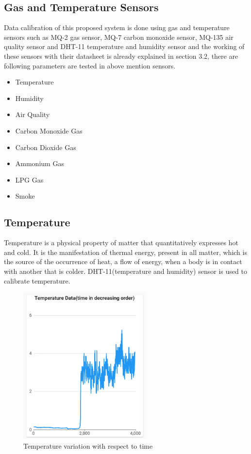 \subsection{Gas and Temperature Sensors}
Data calibration of this proposed system is done using gas and temperature sensors such as MQ-2 gas sensor, MQ-7 carbon monoxide sensor, MQ-135 air quality sensor and DHT-11 temperature and humidity sensor and the working of these sensors with their datasheet is already explained in section 3.2, there are following parameters are tested in above mention sensors.
\begin{itemize}
\item Temperature
\item Humidity
\item Air Quality
\item Carbon Monoxide Gas
\item Carbon Dioxide Gas
\item Ammonium Gas
\item LPG Gas
\item Smoke
\end{itemize}


\subsection{Temperature}
Temperature is a physical property of matter that quantitatively expresses hot and cold. It is the manifestation of thermal energy, present in all matter, which is the source of the occurrence of heat, a flow of energy, when a body is in contact with another that is colder.
DHT-11(temperature and humidity) sensor is used to calibrate temperature.
\begin{figure}[!ht]
\centering
\includegraphics[width=\linewidth,height=8cm]{figures/temp.png}
\caption{\label{img46} Temperature variation with respect to time}
\end{figure}

